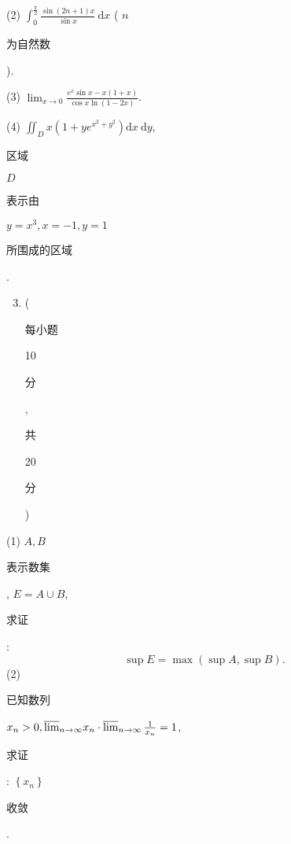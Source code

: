 \documentclass[10pt]{article}
\begin{document}
(2) $\int_{0}^{\frac{\pi}{2}} \frac{\sin (2 n+1) x}{\sin x} \mathrm{~d} x$ ( $n$ \begin{CJK}{UTF8}{mj}为自然数\end{CJK}).

(3) $\lim _{x \rightarrow 0} \frac{e^{x} \sin x-x(1+x)}{\cos x \ln (1-2 x)}$.

(4) $\iint_{D} x\left(1+y e^{x^{2}+y^{2}}\right) \mathrm{d} x \mathrm{~d} y$, \begin{CJK}{UTF8}{mj}区域\end{CJK} $D$ \begin{CJK}{UTF8}{mj}表示由\end{CJK} $y=x^{3}, x=-1, y=1$ \begin{CJK}{UTF8}{mj}所围成的区域\end{CJK}.

\begin{enumerate}
  \setcounter{enumi}{2}
  \item (\begin{CJK}{UTF8}{mj}每小题\end{CJK} 10 \begin{CJK}{UTF8}{mj}分\end{CJK}, \begin{CJK}{UTF8}{mj}共\end{CJK} 20 \begin{CJK}{UTF8}{mj}分\end{CJK})
\end{enumerate}
(1) $A, B$ \begin{CJK}{UTF8}{mj}表示数集\end{CJK}, $E=A \cup B$, \begin{CJK}{UTF8}{mj}求证\end{CJK}:
$$
\sup E=\max (\sup A, \sup B) .
$$
(2) \begin{CJK}{UTF8}{mj}已知数列\end{CJK} $x_{n}>0, \overline{\lim }_{n \rightarrow \infty} x_{n} \cdot \varlimsup_{n \rightarrow \infty} \frac{1}{x_{n}}=1$, \begin{CJK}{UTF8}{mj}求证\end{CJK}: $\left\{x_{n}\right\}$ \begin{CJK}{UTF8}{mj}收敛\end{CJK}.
\end{document}
